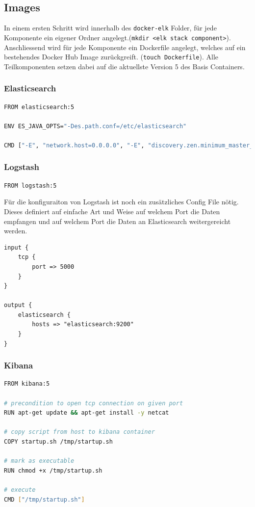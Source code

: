 \subsection{Images}
In einem ersten Schritt wird innerhalb des \lstinline[]|docker-elk| Folder, für jede Komponente ein eigener Ordner angelegt.(\lstinline[]|mkdir <elk stack component>|). Anschliessend wird für jede Komponente ein Dockerfile angelegt, welches auf ein bestehendes Docker Hub Image zurückgreift. (\lstinline[]|touch Dockerfile|). Alle Teilkomponenten setzen dabei auf die aktuellste Version 5 des Basis Containers.

\subsubsection{Elasticsearch}
\begin{lstlisting}[caption=Elasticsearch Dockerfile, language=bash]
FROM elasticsearch:5

ENV ES_JAVA_OPTS="-Des.path.conf=/etc/elasticsearch"

CMD ["-E", "network.host=0.0.0.0", "-E", "discovery.zen.minimum_master_nodes=1"]
\end{lstlisting}

\subsubsection{Logstash} 
\begin{lstlisting}[caption=Logstash Dockerfile, language=bash]
FROM logstash:5
\end{lstlisting}

Für die konfiguraiton von Logstash ist noch ein zusätzliches Config File nötig. Dieses definiert auf einfache Art und Weise auf welchem Port die Daten empfangen und auf welchem Port die Daten an Elasticsearch weitergereicht werden.
\begin{lstlisting}
input {
	tcp {
		port => 5000
	}
}

output {
	elasticsearch {
		hosts => "elasticsearch:9200"
	}
}
\end{lstlisting}

\subsubsection{Kibana} 
\begin{lstlisting}[caption=Kibana Dockerfile, language=bash]
FROM kibana:5

# precondition to open tcp connection on given port
RUN apt-get update && apt-get install -y netcat

# copy script from host to kibana container
COPY startup.sh /tmp/startup.sh

# mark as executable
RUN chmod +x /tmp/startup.sh 

# execute
CMD ["/tmp/startup.sh"] 
\end{lstlisting}

